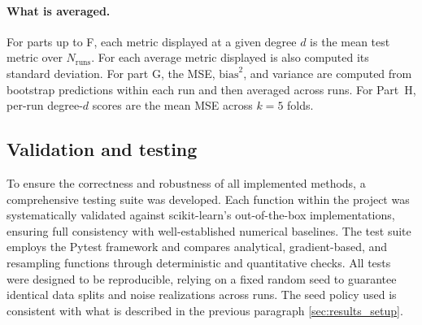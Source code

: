 \documentclass[
    article
 reprint,            %
 amsmath,amssymb,
 aps,
]{revtex4-2}
\begin{document}
\paragraph*{What is averaged.}
For parts up to F, each metric displayed at a given degree $d$ is the mean test metric over $N_{\text{runs}}$. For each average metric displayed is also computed its standard deviation. For part G, the MSE, $\mathrm{bias}^2$, and variance are computed from bootstrap predictions within each run and then averaged across runs. For Part~H, per-run degree-$d$ scores are the mean MSE across $k=5$ folds.




\subsection*{Validation and testing}
\label{Validation_and_Testing}

To ensure the correctness and robustness of all implemented methods, a comprehensive testing suite was developed. 
Each function within the project was systematically validated against scikit-learn's out-of-the-box implementations, 
ensuring full consistency with well-established numerical baselines. 
The test suite employs the Pytest framework and compares analytical, gradient-based, and resampling functions through deterministic and quantitative checks. 
All tests were designed to be reproducible, relying on a fixed random seed to guarantee identical data splits and noise realizations across runs. 
The seed policy used is consistent with what is described in the previous paragraph \ref{sec:results_setup}.
\end{document}
